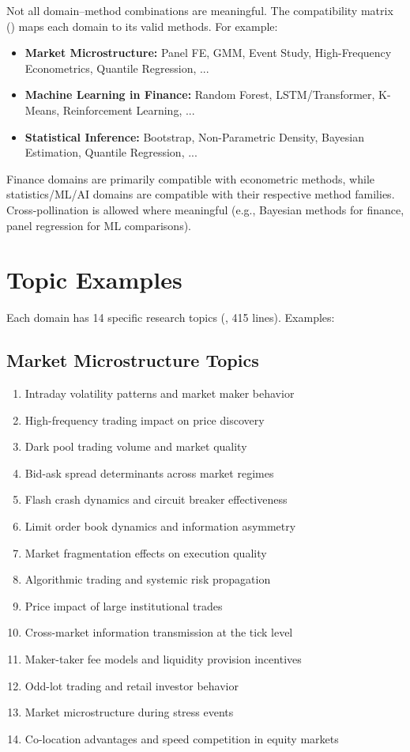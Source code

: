 Not all domain--method combinations are meaningful.
The compatibility matrix () maps each domain to its valid methods.
For example:

\begin{itemize}
  \item \textbf{Market Microstructure:} Panel FE, GMM, Event Study, High-Frequency Econometrics, Quantile Regression, ...
  \item \textbf{Machine Learning in Finance:} Random Forest, LSTM/Transformer, K-Means, Reinforcement Learning, ...
  \item \textbf{Statistical Inference:} Bootstrap, Non-Parametric Density, Bayesian Estimation, Quantile Regression, ...
\end{itemize}

Finance domains are primarily compatible with econometric methods, while statistics/ML/AI domains are compatible with their respective method families.
Cross-pollination is allowed where meaningful (e.g., Bayesian methods for finance, panel regression for ML comparisons).

\section{Topic Examples}
\label{sec:prompts:topics}

Each domain has 14 specific research topics (, 415 lines).
Examples:

\subsection{Market Microstructure Topics}

\begin{enumerate}
  \item Intraday volatility patterns and market maker behavior
  \item High-frequency trading impact on price discovery
  \item Dark pool trading volume and market quality
  \item Bid-ask spread determinants across market regimes
  \item Flash crash dynamics and circuit breaker effectiveness
  \item Limit order book dynamics and information asymmetry
  \item Market fragmentation effects on execution quality
  \item Algorithmic trading and systemic risk propagation
  \item Price impact of large institutional trades
  \item Cross-market information transmission at the tick level
  \item Maker-taker fee models and liquidity provision incentives
  \item Odd-lot trading and retail investor behavior
  \item Market microstructure during stress events
  \item Co-location advantages and speed competition in equity markets
\end{enumerate}

